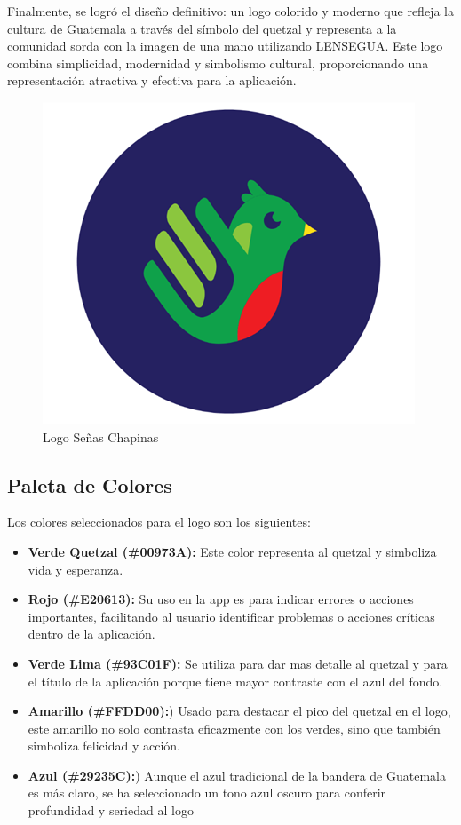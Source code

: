 Finalmente, se logró el diseño definitivo: un logo colorido y moderno que refleja la cultura de Guatemala a través del símbolo del quetzal y representa a la comunidad sorda con la imagen de una mano utilizando LENSEGUA. Este logo combina simplicidad, modernidad y simbolismo cultural, proporcionando una representación atractiva y efectiva para la aplicación. 


\begin{figure} [H]
    \centering
    \includegraphics[width=0.4\linewidth]{figuras/logo_final.png}
    \caption{Logo Señas Chapinas}
    \label{fig:enter-label}
\end{figure}




\subsection{Paleta de Colores}


Los colores seleccionados para el logo son los siguientes:


\begin{itemize}
    
    \item \textbf{Verde Quetzal (\#00973A):} Este color representa al quetzal y simboliza vida y esperanza. 
       
    \item \textbf{Rojo (\#E20613):}  Su uso en la app es para indicar errores o acciones importantes, facilitando al usuario identificar problemas o acciones críticas dentro de la aplicación.

    \item \textbf{Verde Lima (\#93C01F):} Se utiliza para dar mas detalle al quetzal y para el título de la aplicación porque tiene mayor contraste con el azul del fondo. 
    
    \item \textbf{Amarillo (\#FFDD00):}) Usado para destacar el pico del quetzal en el logo, este amarillo no solo contrasta eficazmente con los verdes, sino que también simboliza felicidad y acción. 

    \item \textbf{Azul (\#29235C):}) Aunque el azul tradicional de la bandera de Guatemala es más claro, se ha seleccionado un tono azul oscuro para conferir profundidad y seriedad al logo
    
\end{itemize}

